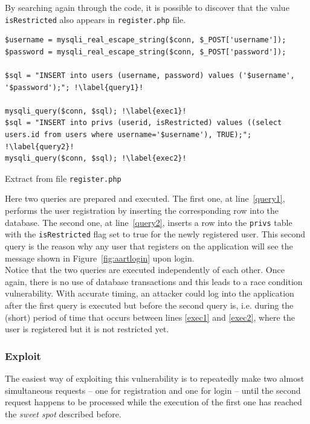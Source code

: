 By searching again through the code, it is possible to discover that the value \texttt{isRestricted} also appears in \texttt{register.php} file.

\begin{listing}[H]
\begin{verbatim}
$username = mysqli_real_escape_string($conn, $_POST['username']);
$password = mysqli_real_escape_string($conn, $_POST['password']);

$sql = "INSERT into users (username, password) values ('$username', '$password');"; !\label{query1}!

mysqli_query($conn, $sql); !\label{exec1}!
$sql = "INSERT into privs (userid, isRestricted) values ((select users.id from users where username='$username'), TRUE);"; !\label{query2}!
mysqli_query($conn, $sql); !\label{exec2}!
\end{verbatim}
\caption{Extract from file \texttt{register.php}}
\end{listing}

Here two queries are prepared and executed. The first one, at line~\ref{query1}, performs the user registration by inserting the corresponding row into the database. The second one, at line~\ref{query2}, inserts a row into the \texttt{privs} table with the \texttt{isRestricted} flag set to true for the newly registered user. This second query is the reason why any user that registers on the application will see the message shown in Figure~\ref{fig:aartlogin} upon login. \\

Notice that the two queries are executed independently of each other. Once again, there is no use of database transactions and this leads to a race condition vulnerability. With accurate timing, an attacker could log into the application after the first query is executed but before the second query is, i.e.  during the (short) period of time that occurs between lines \ref{exec1} and \ref{exec2}, where the user is registered but it is not restricted yet. \\

\subsubsection{Exploit}

The easiest way of exploiting this vulnerability is to repeatedly make two almost simultaneous requests -- one for registration and one for login -- until the second request happens to be processed while the execution of the first one has reached the \textit{sweet spot} described before.

